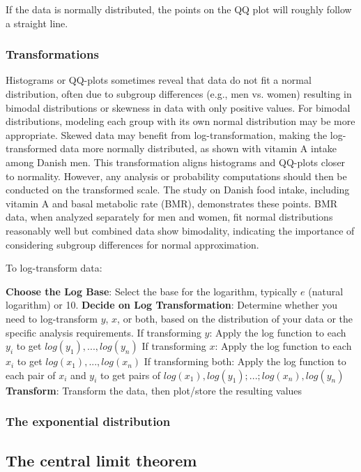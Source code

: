 \documentclass{article}
\begin{document}
If the data is normally distributed, the points on the QQ plot will roughly follow a straight line.

\subsubsection{Transformations}

Histograms or QQ-plots sometimes reveal that data do not fit a normal distribution, often due to subgroup differences (e.g., men vs. women) resulting in bimodal distributions or skewness in data with only positive values. For bimodal distributions, modeling each group with its own normal distribution may be more appropriate. Skewed data may benefit from log-transformation, making the log-transformed data more normally distributed, as shown with vitamin A intake among Danish men. This transformation aligns histograms and QQ-plots closer to normality. However, any analysis or probability computations should then be conducted on the transformed scale. The study on Danish food intake, including vitamin A and basal metabolic rate (BMR), demonstrates these points. BMR data, when analyzed separately for men and women, fit normal distributions reasonably well but combined data show bimodality, indicating the importance of considering subgroup differences for normal approximation.

To log-transform data:

\begin{outline}
    \1 \textbf{Choose the Log Base}: Select the base for the logarithm, typically $e$ (natural logarithm) or 10.
    \1 \textbf{Decide on Log Transformation}: Determine whether you need to log-transform $y$, $x$, or both, based on the distribution of your data or the specific analysis requirements.
        \2 If transforming $y$: Apply the log function to each $y_i$ to get $log(y_1), ..., log(y_n)$
        \2 If transforming $x$: Apply the log function to each $x_i$ to get $log(x_1), ..., log(x_n)$
        \2 If transforming both: Apply the log function to each pair of $x_i$ and $y_i$ to get pairs of $log(x_1),log(y_1);...;log(x_n),log(y_n)$
    \1 \textbf{Transform}: Transform the data, then plot/store the resulting values
\end{outline}

\subsubsection{The exponential distribution}

\subsection{The central limit theorem}
\end{document}
